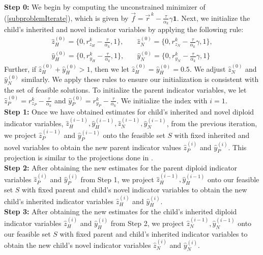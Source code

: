 \documentclass{article}
\begin{document}
\noindent \textbf{Step 0:} We begin by computing the unconstrained minimizer of (\ref{subproblemIterate}), which is given by $\vec{f} = \vec{r}^{\,k} - \frac{\tau}{\alpha_k}\gamma\mathbf{1}$. %
Next,  we initialize the child's inherited and novel indicator variables by applying the following rule:
\begin{equation*}
	\begin{aligned}
		\hat{z}_H^{(0)} = \{0,r_{z_H}^k - \frac{\tau}{\alpha_k},1 \}, & \quad \hat{z}_N^{(0)} = \{0,r_{z_N}^k - \frac{\tau}{\alpha_k}\gamma,1 \},\\
		\hat{y}_H^{(0)} = \{0,r_{y_H}^k - \frac{\tau}{\alpha_k},1 \}, &
		\quad \hat{y}_N^{(0)} = \{0,r_{y_N}^k - \frac{\tau}{\alpha_k}\gamma,1 \}
	\end{aligned}
\end{equation*}
Further, if $\hat{z}_H^{(0)} + \hat{y}_H^{(0)}>1$, then we let $\hat{z}_H^{(0)} = \hat{y}_H^{(0)} = 0.5$. We adjust $\hat{z}_N^{(0)}$ and $\hat{y}_N^{(0)}$ similarly. We apply these rules to ensure our initialization is consistent with the set of feasible solutions. To initialize the parent indicator variables, we let $\hat{z}_P^{(0)} = r_{z_P}^k - \frac{\tau}{\alpha_k}$ and $\hat{y}_P^{(0)} = r_{y_P}^k - \frac{\tau}{\alpha_k}$. 
We initialize the index with $i=1$. \\

\noindent \textbf{Step 1:} Once we have obtained estimates for child's inherited and novel diploid indicator variables, $\hat{z}_H^{(i-1)}, \hat{y}_H^{(i-1)}, \hat{z}_N^{(i-1)}, \hat{y}_N^{(i-1)}$, from the previous iteration, we project $\hat{z}_P^{(i-1)}$ and $\hat{y}_P^{(i-1)}$ onto the feasible set $S$ with fixed inherited and novel variables to obtain the new parent indicator values $\hat{z}_P^{(i)}$ and $\hat{y}_P^{(i)}$. This projection is similar to the projections done in \cite{MB_SingleParentDiploid, MB_diploidTrios}. \\

\noindent \textbf{Step 2:} After obtaining the new estimates for the parent diploid indicator variables $\hat{z}_P^{(i)}$ and $\hat{y}_P^{(i)}$ from Step 1, we project $\hat{z}_H^{(i-1)}, \hat{y}_H^{(i-1)}$ onto our feasible set $S$ with fixed parent and child's novel indicator variables to obtain the new child's inherited indicator variables $\hat{z}_H^{(i)}$ and $\hat{y}_H^{(i)}$.\\ 

\noindent \textbf{Step 3:} After obtaining the new estimates for the child's inherited diploid indicator variables $\hat{z}_H^{(i)}$ and $\hat{y}_H^{(i)}$ from Step 2, we project $\hat{z}_N^{(i-1)}, \hat{y}_N^{(i-1)}$ onto our feasible set $S$ with fixed parent and child's inherited indicator variables to obtain the new child's novel indicator variables $\hat{z}_N^{(i)}$ and $\hat{y}_N^{(i)}$. \\
\end{document}
